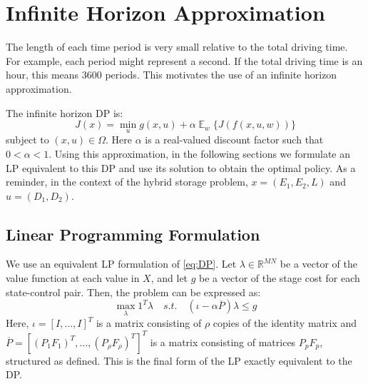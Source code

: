 \documentclass[conference]{IEEEtran}
\DeclareMathOperator{\E}{\mathbb{E}}
\begin{document}
\section{Infinite Horizon Approximation}
The length of each time period is very small relative to the total driving time. For example, each period might represent a second. If the total driving time is an hour, this means 3600 periods. This motivates the use of an infinite horizon approximation.

The infinite horizon DP is:
\begin{equation} \label{eq:DP}
J(x)=\min_{u} g(x,u) + \alpha\mathop{\E}_{w} \{J(f(x,u,w))\}
\end{equation} subject to $(x,u)\in\Omega$. Here $\alpha$ is a real-valued discount factor such that $0<\alpha<1$. Using this approximation, in the following sections we formulate an LP equivalent to this DP and use its solution to obtain the optimal policy. As a reminder, in the context of the hybrid storage problem, $x=(E_{1},E_{2},L)$ and $u=(D_{1},D_{2})$.


\subsection{Linear Programming Formulation}
We use an equivalent LP formulation of \eqref{eq:DP}. Let $\lambda\in\mathbb{R}^{MN}$ be a vector of the value function at each value in $X$, and let $g$ be a vector of the stage cost for each state-control pair. Then, the problem can be expressed as:
\begin{equation} \label{eq:LPfinal}
    \max_{\lambda} 1^{T} \lambda
    \hspace{1em}s.t.\hspace{1em}
    (\iota-\alpha \overline{P})\lambda \leq g
\end{equation} Here, $\iota=[I,...,I]^{T}$ is a matrix consisting of $\rho$ copies of the identity matrix and $\overline{P}=[(P_{1}F_{1})^{T},...,(P_{\rho}F_{\rho})^{T}]^{T}$ is a matrix consisting of matrices $P_{p}F_{p}$, structured as defined. %
This is the final form of the LP exactly equivalent to the DP. 
\end{document}
